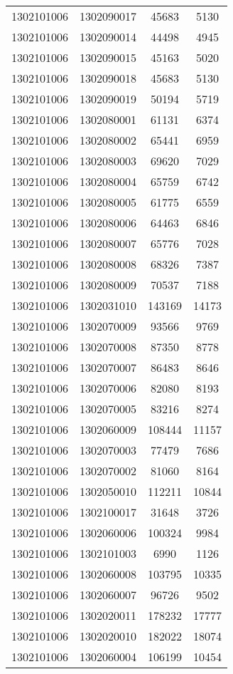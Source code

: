 \begin{longtable}[h]{llcc}
		1302101006 & 1302090017 & 45683 & 5130\\
		1302101006 & 1302090014 & 44498 & 4945\\
		1302101006 & 1302090015 & 45163 & 5020\\
		1302101006 & 1302090018 & 45683 & 5130\\
		1302101006 & 1302090019 & 50194 & 5719\\
		1302101006 & 1302080001 & 61131 & 6374\\
		1302101006 & 1302080002 & 65441 & 6959\\
		1302101006 & 1302080003 & 69620 & 7029\\
		1302101006 & 1302080004 & 65759 & 6742\\
		1302101006 & 1302080005 & 61775 & 6559\\
		1302101006 & 1302080006 & 64463 & 6846\\
		1302101006 & 1302080007 & 65776 & 7028\\
		1302101006 & 1302080008 & 68326 & 7387\\
		1302101006 & 1302080009 & 70537 & 7188\\
		1302101006 & 1302031010 & 143169 & 14173\\
		1302101006 & 1302070009 & 93566 & 9769\\
		1302101006 & 1302070008 & 87350 & 8778\\
		1302101006 & 1302070007 & 86483 & 8646\\
		1302101006 & 1302070006 & 82080 & 8193\\
		1302101006 & 1302070005 & 83216 & 8274\\
		1302101006 & 1302060009 & 108444 & 11157\\
		1302101006 & 1302070003 & 77479 & 7686\\
		1302101006 & 1302070002 & 81060 & 8164\\
		1302101006 & 1302050010 & 112211 & 10844\\
		1302101006 & 1302100017 & 31648 & 3726\\
		1302101006 & 1302060006 & 100324 & 9984\\
		1302101006 & 1302101003 & 6990 & 1126\\
		1302101006 & 1302060008 & 103795 & 10335\\
		1302101006 & 1302060007 & 96726 & 9502\\
		1302101006 & 1302020011 & 178232 & 17777\\
		1302101006 & 1302020010 & 182022 & 18074\\
		1302101006 & 1302060004 & 106199 & 10454\\

\end{longtable}
